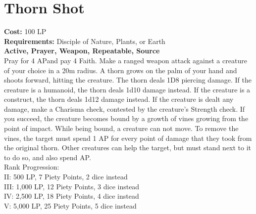 \section{Thorn Shot}\label{prayer:thornShot}
\textbf{Cost:} 100 LP\\
\textbf{Requirements:} Disciple of Nature, Plants, or Earth \\
\textbf{Active, Prayer, Weapon, Repeatable, Source}\\
Pray for 4 APand pay 4 Faith.
Make a ranged weapon attack against a creature of your choice in a 20m radius.
A thorn grows on the palm of your hand and shoots forward, hitting the creature.
The thorn deals 1D8 piercing damage.
If the creature is a humanoid, the thorn deals 1d10 damage instead.
If the creature is a construct, the thorn deals 1d12 damage instead.
If the creature is dealt any damage, make a Charisma check, contested by the creature's Strength check.
If you succeed, the creature becomes bound by a growth of vines growing from the point of impact.
While being bound, a creature can not move.
To remove the vines, the target must spend 1 AP for every point of damage that they took from the original thorn.
Other creatures can help the target, but must stand next to it to do so, and also spend AP.
\\
Rank Progression:\\
II: 500 LP, 7 Piety Points, 2 dice instead\\
III: 1,000 LP, 12 Piety Points, 3 dice instead\\
IV: 2,500 LP, 18 Piety Points, 4 dice instead\\
V: 5,000 LP, 25 Piety Points, 5 dice instead\\